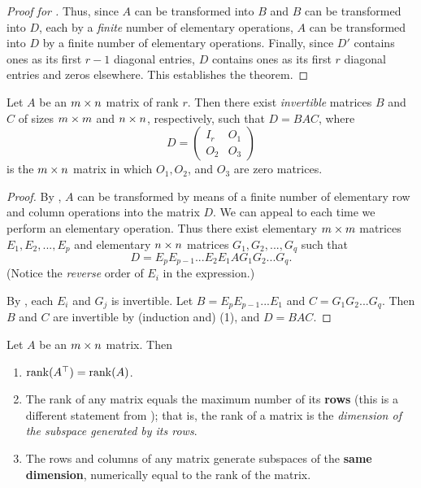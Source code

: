 \begin{proof}[Proof for ]
Thus, since \(A\) can be transformed into \(B\) and \(B\) can be transformed into \(D\), each by a \emph{finite} number of elementary operations,
\(A\) can be transformed into \(D\) by a finite number of elementary operations.
Finally, since \(D'\) contains ones as its first \(r - 1\) diagonal entries, \(D\) contains ones as its first \(r\) diagonal entries and zeros elsewhere.
This establishes the theorem.
\end{proof}

\begin{corollary} \label{corollary 3.6.1}
Let \(A\) be an \(m \times n\) matrix of rank \(r\).
Then there exist \emph{invertible} matrices \(B\) and \(C\) of sizes \(m \times m\) and \(n \times n\), respectively, such that \(D = BAC\), where
\[
    D = \begin{pmatrix}
        I_r & O_1 \\
        O_2 & O_3
    \end{pmatrix}
\]
is the \(m \times n\) matrix in which \(O_1, O_2\), and \(O_3\) are zero matrices.
\end{corollary}

\begin{proof}
By , \(A\) can be transformed by means of a finite number of elementary row and column operations into the matrix \(D\).
We can appeal to  each time we perform an elementary operation.
Thus there exist elementary \(m \times m\) matrices \(E_1, E_2, ..., E_p\) and elementary \(n \times n\) matrices \(G_1, G_2, ..., G_q\) such that
\[
    D = E_p E_{p - 1} ... E_2 E_1 A G_1 G_2 ... G_q.
\]
(Notice the \emph{reverse} order of \(E_i\) in the expression.)

By , each \(E_i\) and \(G_j\) is invertible.
Let \(B = E_p E_{p - 1} ... E_1\) and \(C = G_1 G_2 ... G_q\).
Then \(B\) and \(C\) are invertible by (induction and) (1), and \(D = BAC\).
\end{proof}

\begin{corollary} \label{corollary 3.6.2}
Let \(A\) be an \(m \times n\) matrix.
Then
\begin{enumerate}
\item \(\mathrm{rank}(A^\top) = \mathrm{rank}(A)\).
\item The rank of any matrix equals the maximum number of its \LID{} \textbf{rows} (this is a different statement from );
    that is, the rank of a matrix is the \emph{dimension of the subspace generated by its rows}.
\item The rows and columns of any matrix generate subspaces of the \textbf{same dimension}, numerically equal to the rank of the matrix.
\end{enumerate}
\end{corollary}

